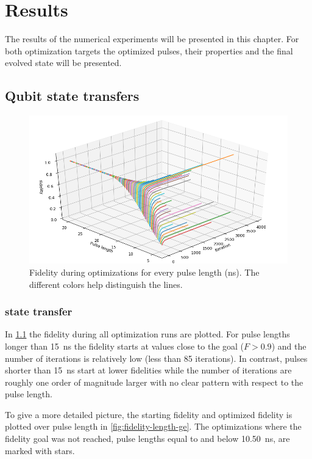 \documentclass[main.tex]{subfiles}
\begin{document}
\chapter{Results}
The results of the numerical experiments will be presented in this chapter.
For both optimization targets the optimized pulses, their properties and the final evolved state will be presented.


\section{Qubit state transfers}
\begin{figure}[H]
    \centering
    \includegraphics[width=\linewidth]{figs/3d-optim-ge.png}
    \caption{Fidelity during optimizations for every pulse length (ns). The different colors help distinguish the lines.}\label{fig:3d-optim-ge}
\end{figure}
\subsection{%
	\texorpdfstring{}{0 -> 1} state transfer
}

In \cref{fig:3d-optim-ge} the fidelity during all optimization runs are plotted.
For pulse lengths longer than \SI{15}{\nano\second} the fidelity starts at values close to the goal (\(F>0.9\)) and the number of iterations is relatively low (less than 85 iterations).
In contrast, pulses shorter than \SI{15}{\nano\second} start at lower fidelities while the number of iterations are roughly one order of magnitude larger with no clear pattern with respect to the pulse length.

To give a more detailed picture, the starting fidelity and optimized fidelity is plotted over pulse length in \cref{fig:fidelity-length-ge}.
The optimizations where the fidelity goal was not reached, pulse lengths equal to and below \SI{10.50}{\nano\second}, are marked with stars.
\end{document}
